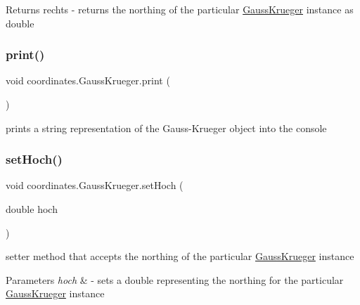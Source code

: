 \begin{DoxyReturn}{Returns}
rechts -\/ returns the northing of the particular \hyperlink{classcoordinates_1_1_gauss_krueger}{Gauss\+Krueger} instance as double 
\end{DoxyReturn}
\mbox{\label{classcoordinates_1_1_gauss_krueger_a68b8bf6307cf0c9732f5034d8cf70df8}} 
\subsubsection{\texorpdfstring{print()}{print()}}
{\footnotesize\ttfamily void coordinates.\+Gauss\+Krueger.\+print (\begin{DoxyParamCaption}{ }\end{DoxyParamCaption})}



prints a string representation of the Gauss-\/\+Krueger object into the console 

\mbox{\label{classcoordinates_1_1_gauss_krueger_acf100c94ccd6ce16857ec83876578aa5}} 
\subsubsection{\texorpdfstring{set\+Hoch()}{setHoch()}}
{\footnotesize\ttfamily void coordinates.\+Gauss\+Krueger.\+set\+Hoch (\begin{DoxyParamCaption}\item[{double}]{hoch }\end{DoxyParamCaption})}



setter method that accepts the northing of the particular \hyperlink{classcoordinates_1_1_gauss_krueger}{Gauss\+Krueger} instance 


\begin{DoxyParams}{Parameters}
{\em hoch} & -\/ sets a double representing the northing for the particular \hyperlink{classcoordinates_1_1_gauss_krueger}{Gauss\+Krueger} instance \\
\hline
\end{DoxyParams}
\mbox{\label{classcoordinates_1_1_gauss_krueger_a9dc35489df5fd3430d61f0d47ca27b82}} 
